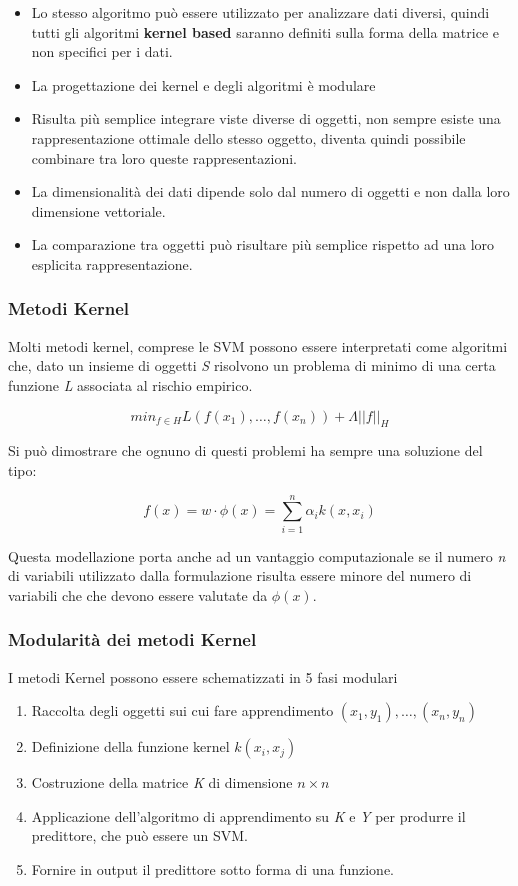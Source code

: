 \begin{itemize}
\tightlist
\item
  Lo stesso algoritmo può essere utilizzato per analizzare dati diversi,
  quindi tutti gli algoritmi \textbf{kernel based} saranno definiti
  sulla forma della matrice e non specifici per i dati.
\item
  La progettazione dei kernel e degli algoritmi è modulare
\item
  Risulta più semplice integrare viste diverse di oggetti, non sempre
  esiste una rappresentazione ottimale dello stesso oggetto, diventa
  quindi possibile combinare tra loro queste rappresentazioni.
\item
  La dimensionalità dei dati dipende solo dal numero di oggetti e non
  dalla loro dimensione vettoriale.
\item
  La comparazione tra oggetti può risultare più semplice rispetto ad una
  loro esplicita rappresentazione.
\end{itemize}

\subsubsection{Metodi Kernel}\label{metodi-kernel}

Molti metodi kernel, comprese le SVM possono essere interpretati come
algoritmi che, dato un insieme di oggetti \emph{S} risolvono un problema
di minimo di una certa funzione \emph{L} associata al rischio empirico.

$$ min_{f \in H} L(f(x_1),\ldots, f(x_n)) + \varLambda ||f||_H$$

Si può dimostrare che ognuno di questi problemi ha sempre una soluzione del tipo:

$$ f(x) = w \cdot \phi(x) = \sum\limits_{i=1}^n \alpha_i k(x,x_i)$$

Questa modellazione porta anche ad un vantaggio computazionale se il numero \textit{n} di variabili utilizzato dalla formulazione risulta essere minore del numero di variabili che che devono essere valutate da $\phi(x)$.

\subsubsection{Modularità dei metodi Kernel}\label{modularituxe0-dei-metodi-kernel}

I metodi Kernel possono essere schematizzati in 5 fasi modulari

\begin{enumerate}
\item
  Raccolta degli oggetti sui cui fare apprendimento $(x_1,y_1), \ldots, (x_n, y_n)$
\item
  Definizione della funzione kernel $k(x_i,x_j)$
\item
  Costruzione della matrice \emph{K} di dimensione $n \times n$
\item
  Applicazione dell'algoritmo di apprendimento su \emph{K} e \emph{Y} per produrre il predittore, che può essere un SVM.
\item
  Fornire in output il predittore sotto forma di una funzione.
\end{enumerate}

